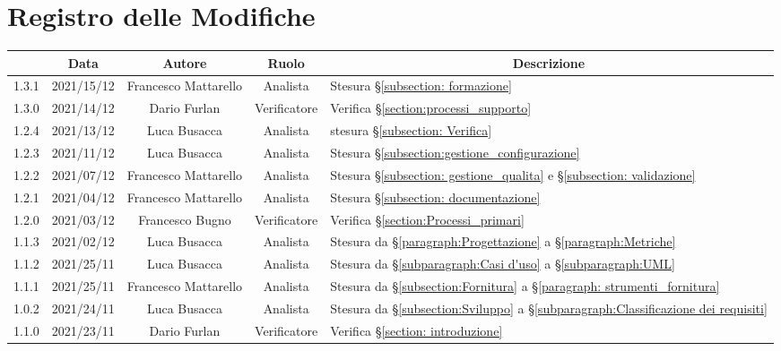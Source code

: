 \thispagestyle{empty}
\section*{Registro delle Modifiche}

\begin{center}
	\renewcommand{\arraystretch}{1.8}
	\begin{longtable}[c]{c | c | c | c | p{5cm}}
		\rowcolor[HTML]{125E28}
		\multicolumn{1}{c}{\color[HTML]{FFFFFF} \textbf{Versione}} & 
		\multicolumn{1}{c}{\color[HTML]{FFFFFF} \textbf{Data}} & 
		\multicolumn{1}{c}{\color[HTML]{FFFFFF} \textbf{Autore}} & 
		\multicolumn{1}{c}{\color[HTML]{FFFFFF} \textbf{Ruolo}} & 
		\multicolumn{1}{c}{\color[HTML]{FFFFFF} \textbf{Descrizione}} \\
		\endhead
		1.3.1 & 2021/15/12 & Francesco Mattarello & Analista & Stesura §\ref{subsection: formazione}\\
		1.3.0 & 2021/14/12 & Dario Furlan & Verificatore & Verifica §\ref{section:processi_supporto}\\
		1.2.4 & 2021/13/12 & Luca Busacca & Analista & stesura §\ref{subsection: Verifica}\\
		1.2.3 & 2021/11/12 & Luca Busacca & Analista & Stesura  §\ref{subsection:gestione_configurazione} \\
		1.2.2 & 2021/07/12 & Francesco Mattarello & Analista & Stesura §\ref{subsection: gestione_qualita} e §\ref{subsection: validazione}\\
		1.2.1 & 2021/04/12 & Francesco Mattarello & Analista & Stesura §\ref{subsection: documentazione}\\
		1.2.0 & 2021/03/12 & Francesco Bugno & Verificatore & Verifica §\ref{section:Processi_primari} \\
		1.1.3 & 2021/02/12 & Luca Busacca & Analista & Stesura da  §\ref{paragraph:Progettazione} a §\ref{paragraph:Metriche} \\
		1.1.2 & 2021/25/11 & Luca Busacca & Analista & Stesura da  §\ref{subparagraph:Casi d'uso} a §\ref{subparagraph:UML} \\
		1.1.1 & 2021/25/11 & Francesco Mattarello & Analista & Stesura da §\ref{subsection:Fornitura} a §\ref{paragraph: strumenti_fornitura} \\
		1.0.2 & 2021/24/11 & Luca Busacca & Analista & Stesura da §\ref{subsection:Sviluppo} a  §\ref{subparagraph:Classificazione dei requisiti} \\
		1.1.0 & 2021/23/11 & Dario Furlan & Verificatore & Verifica §\ref{section: introduzione} \\

\end{longtable}
\end{center}
